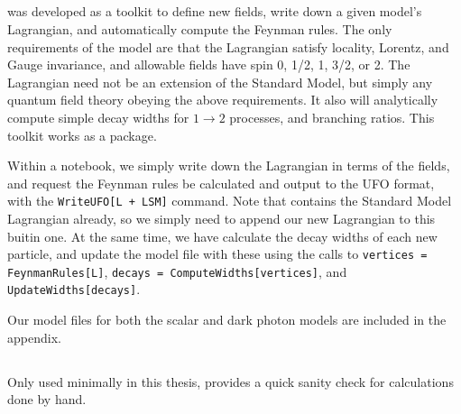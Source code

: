 \subsection{\feynrules}
\feynrules was developed as a toolkit to define new fields, write down a given model's Lagrangian, and automatically compute the Feynman rules.
The only requirements of the model are that the Lagrangian satisfy locality, Lorentz, and Gauge invariance, and allowable fields have spin 0, 1/2, 1, 3/2, or 2. The Lagrangian need not be an extension of the Standard Model, but simply any quantum field theory obeying the above requirements. 
It also will analytically compute simple decay widths for $1 \rightarrow 2$ processes, and branching ratios.
This toolkit works as a \mathematica package.

Within a \mathematica notebook, we simply write down the Lagrangian in terms of the fields, and request the Feynman rules be calculated and output to the UFO format, with the \texttt{WriteUFO[L + LSM]} command. Note that \feynrules contains the Standard Model Lagrangian already, so we simply need to append our new Lagrangian to this buitin one.
At the same time, we have \feynrules calculate the decay widths of each new particle, and update the model file with these using the calls to \texttt{vertices = FeynmanRules[L]}, \texttt{decays = ComputeWidths[vertices]}, and \texttt{UpdateWidths[decays]}.

Our model files for both the scalar and dark photon models are included in the appendix. 

\subsection{\feyncalc}
Only used minimally in this thesis, \feyncalc provides a quick sanity check for calculations done by hand.
